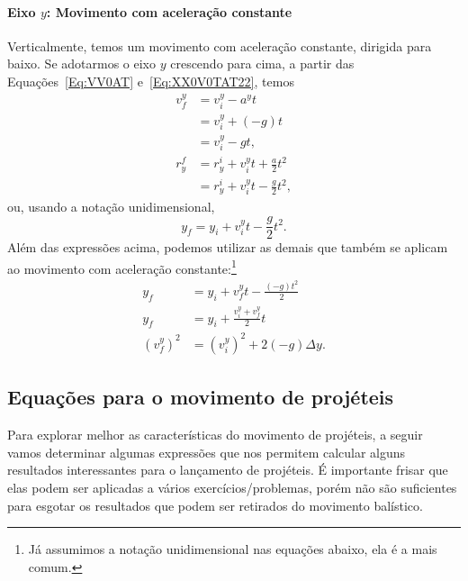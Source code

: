 \paragraph{Eixo $y$: Movimento com aceleração constante}

Verticalmente, temos um movimento com aceleração constante, dirigida para baixo. Se adotarmos o eixo $y$ crescendo para cima, a partir das Equações~\eqref{Eq:VV0AT} e~\eqref{Eq:XX0V0TAT22}, temos
\begin{align}
  v_{f}^y &= v_{i}^y - a^y t \\
  &= v_{i}^y + (-g) t \\
  &= v_{i}^y - g t, \\
  r_y^f &= r_y^i + v_{i}^y t + \frac{a}{2}t^2 \\
  &= r_y^i + v_{i}^y t - \frac{g}{2}t^2, \label{Eq:PosYProj}
\end{align}
%
ou, usando a notação unidimensional,
\begin{equation}
    y_f = y_i + v_{i}^y t - \frac{g}{2}t^2.
\end{equation}
%
Além das expressões acima, podemos utilizar as demais que também se aplicam ao movimento com aceleração constante:\footnote{Já assumimos a notação unidimensional nas equações abaixo, ela é a mais comum.}
\begin{align}
	y_f &= y_i + v_f^y t - \frac{(-g)t^2}{2} \\
	y_f &= y_i + \frac{v_i^y + v_f^y}{2} t \\
	(v_f^y)^2 &= (v_i^y)^2 + 2 (-g) \Delta y. \label{Eq:TorricelliMovProj}
\end{align}

\subsection{Equações para o movimento de projéteis}

Para explorar melhor as características do movimento de projéteis, a seguir vamos determinar algumas expressões que nos permitem calcular alguns resultados interessantes para o lançamento de projéteis. É importante frisar que elas podem ser aplicadas a vários exercícios/problemas, porém não são suficientes para esgotar os resultados que podem ser retirados do movimento balístico.

